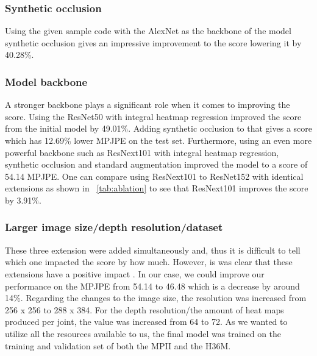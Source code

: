 \subsubsection*{Synthetic occlusion}
Using the given sample code with the AlexNet as the backbone of the model synthetic occlusion
gives an impressive improvement to the score lowering it by 40.28\%.

\subsubsection*{Model backbone}
A stronger backbone plays a significant role when it comes to improving the score.
Using the ResNet50 with integral heatmap regression improved the score from the initial model by 49.01\%.
Adding synthetic occlusion to that gives a score which has 12.69\% lower MPJPE on the test set.
Furthermore, using an even more powerful backbone such as ResNext101 with integral heatmap regression, synthetic occlusion and standard augmentation improved the model to a score of 54.14 MPJPE.
One can compare using ResNext101 to ResNet152 with identical extensions
as shown in ~\ref{tab:ablation} to see that ResNext101 improves the score by 3.91\%.

\subsubsection*{Larger image size/depth resolution/dataset} These three extension were added simultaneously and, thus it is difficult to tell which one impacted the score by how much.
However, is was clear that these extensions have a positive impact \cite{sun_integral_2018-1}.
In our case, we could improve our performance on the MPJPE from 54.14 to 46.48 which is a decrease by around 14\%.
Regarding the changes to the image size, the resolution was increased from 256 x 256 to 288 x 384.
For the depth resolution/the amount of heat maps produced per joint, the value was increased from 64 to 72.
As we wanted to utilize all the resources available to us, the final model was trained on the training and validation set of both the MPII and the H36M.


